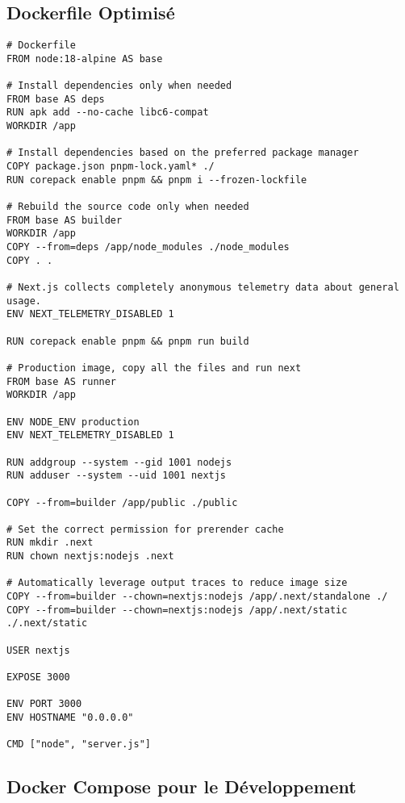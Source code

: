 \subsection{Dockerfile Optimisé}

\begin{lstlisting}[language=Docker, caption=Dockerfile multi-stage]
# Dockerfile
FROM node:18-alpine AS base

# Install dependencies only when needed
FROM base AS deps
RUN apk add --no-cache libc6-compat
WORKDIR /app

# Install dependencies based on the preferred package manager
COPY package.json pnpm-lock.yaml* ./
RUN corepack enable pnpm && pnpm i --frozen-lockfile

# Rebuild the source code only when needed
FROM base AS builder
WORKDIR /app
COPY --from=deps /app/node_modules ./node_modules
COPY . .

# Next.js collects completely anonymous telemetry data about general usage.
ENV NEXT_TELEMETRY_DISABLED 1

RUN corepack enable pnpm && pnpm run build

# Production image, copy all the files and run next
FROM base AS runner
WORKDIR /app

ENV NODE_ENV production
ENV NEXT_TELEMETRY_DISABLED 1

RUN addgroup --system --gid 1001 nodejs
RUN adduser --system --uid 1001 nextjs

COPY --from=builder /app/public ./public

# Set the correct permission for prerender cache
RUN mkdir .next
RUN chown nextjs:nodejs .next

# Automatically leverage output traces to reduce image size
COPY --from=builder --chown=nextjs:nodejs /app/.next/standalone ./
COPY --from=builder --chown=nextjs:nodejs /app/.next/static ./.next/static

USER nextjs

EXPOSE 3000

ENV PORT 3000
ENV HOSTNAME "0.0.0.0"

CMD ["node", "server.js"]
\end{lstlisting}

\subsection{Docker Compose pour le Développement}


